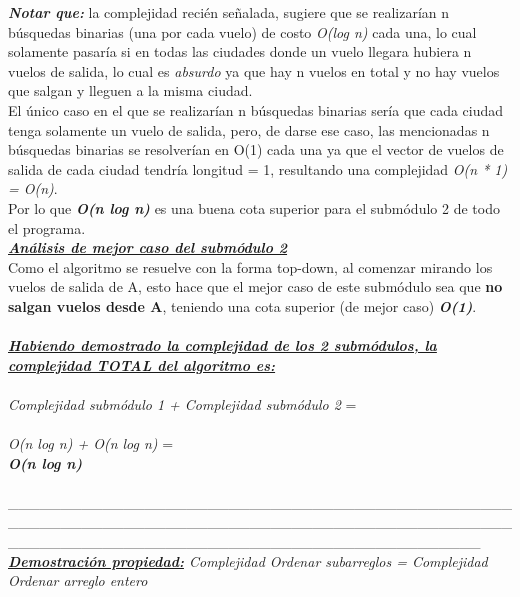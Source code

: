 \documentclass[10pt,a4paper]{article}
\begin{document}
\textit{\textbf{Notar que:}} la complejidad recién señalada, sugiere que se realizarían n búsquedas binarias (una por cada vuelo) de costo \textit{O(log n)} cada una, lo cual solamente pasaría si en todas las ciudades donde un vuelo llegara hubiera n vuelos de salida, lo cual es \textit{absurdo} ya que hay n vuelos en total y no hay vuelos que salgan y lleguen a la misma ciudad.\\
El único caso en el que se realizarían n búsquedas binarias sería que cada ciudad tenga solamente un vuelo de salida, pero, de darse ese caso, las mencionadas n búsquedas binarias se resolverían en O(1) cada una ya que el vector de vuelos de salida de cada ciudad tendría longitud = 1, resultando una complejidad \textit{O(n * 1) = O(n)}.\\
Por lo que \textit{\textbf{O(n log n)}} es una buena cota superior para el submódulo 2 de todo el programa.\\

\textit{\textbf{\underline{Análisis de mejor caso del submódulo 2}}}\\
Como el algoritmo se resuelve con la forma top-down, al comenzar mirando los vuelos de salida de A, esto hace que el mejor caso de este submódulo sea que \textbf{no salgan vuelos desde A}, teniendo una cota superior (de mejor caso) \textit{\textbf{O(1)}}.\\ \\

\noindent \underline{\textbf{\textit{Habiendo demostrado la complejidad de los 2 submódulos, la complejidad TOTAL del algoritmo es:}}} \\ \\
\textit{Complejidad submódulo 1 + Complejidad submódulo 2} = \\ \\
\textit{O(n log n) + O(n log n)} = \\ 

\noindent \textbf{\textit{O(n log n)}}\\ \\
\_\_\_\_\_\_\_\_\_\_\_\_\_\_\_\_\_\_\_\_\_\_\_\_\_\_\_\_\_\_\_\_\_\_\_\_\_\_\_\_\_\_\_\_\_\_\_\_\_\_\_\_\_\_\_\_\_\_\_\_\_\_\_\_\_\_\_\_\_\_\_\_\_\_\_\_\_\_\_\_\_\_\_\_\_\_\_\_\_\_\_\_\_\_\_\_\_\_\_\_\_\_\_\_\_\_\_\_\_\_\_\_\_\_\_\_\_\_\_\_\_\_\_\_\_\_\_\_\_\_\_\_\_\_\_\_\_\_\_\_\_
\\

\noindent \textit{\underline{\textbf{Demostración propiedad:}} Complejidad Ordenar subarreglos = Complejidad Ordenar arreglo entero}\\
\end{document}

